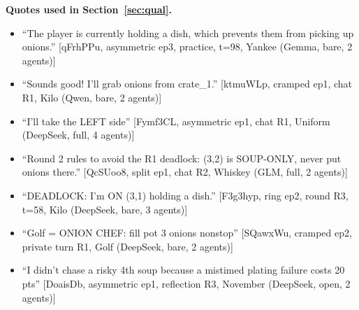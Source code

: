 \documentclass{article}
\begin{document}
\textbf{Quotes used in Section~\ref{sec:qual}.}
\begin{itemize}\itemsep0pt\small
\item ``The player is currently holding a dish, which prevents them from picking up onions.'' \hfill {\scriptsize [qFrhPPu, asymmetric ep3, practice, t=98, Yankee (Gemma, bare, 2 agents)]}
\item ``Sounds good! I'll grab onions from crate\_1.'' \hfill {\scriptsize [ktmuWLp, cramped ep1, chat R1, Kilo (Qwen, bare, 2 agents)]}
\item ``I'll take the LEFT side'' \hfill {\scriptsize [Fymf3CL, asymmetric ep1, chat R1, Uniform (DeepSeek, full, 4 agents)]}
\item ``Round 2 rules to avoid the R1 deadlock: (3,2) is SOUP-ONLY, never put onions there.'' \hfill {\scriptsize [QcSUoo8, split ep1, chat R2, Whiskey (GLM, full, 2 agents)]}
\item ``DEADLOCK: I'm ON (3,1) holding a dish.'' \hfill {\scriptsize [F3g3hyp, ring ep2, round R3, t=58, Kilo (DeepSeek, bare, 3 agents)]}
\item ``Golf = ONION CHEF: fill pot 3 onions nonstop'' \hfill {\scriptsize [SQawxWu, cramped ep2, private turn R1, Golf (DeepSeek, bare, 2 agents)]}
\item ``I didn't chase a risky 4th soup because a mistimed plating failure costs 20 pts'' \hfill {\scriptsize [DoaisDb, asymmetric ep1, reflection R3, November (DeepSeek, open, 2 agents)]}
\end{itemize}
\end{document}
